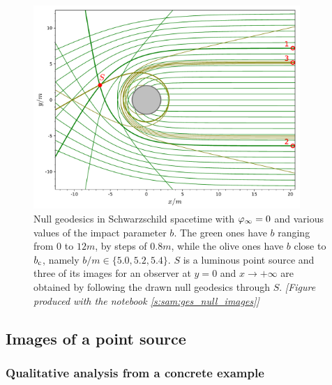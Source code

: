 \begin{figure}
\centerline{\includegraphics[width=0.9\textwidth]{ges_mult_images.pdf}}
\caption[]{\label{f:gis:mult_images} \footnotesize
Null geodesics in Schwarzschild spacetime with $\varphi_\infty=0$ and various values of the impact parameter $b$.
The green ones have $b$ ranging from $0$ to $12 m$, by steps of
$0.8 m$, while the olive ones have $b$ close to $b_{\rm c}$,
namely $b/m\in\{5.0, 5.2, 5.4\}$. $S$ is a luminous point source
and three of its images for an observer at $y=0$ and $x\to + \infty$ are obtained by
following the drawn null geodesics through $S$.
\textsl{[Figure produced with the notebook \ref{s:sam:ges_null_images}]}
}
\end{figure}

\subsection{Images of a point source} \label{s:gis:images_point}


\subsubsection{Qualitative analysis from a concrete example}

